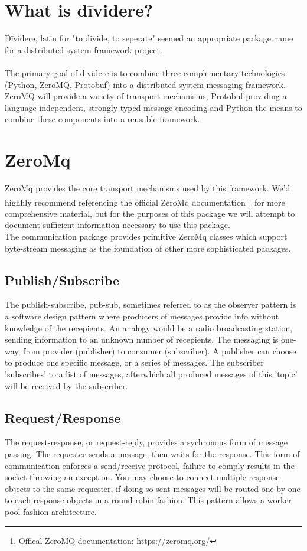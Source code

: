 \documentclass[fontsize=12pt]{book}
\begin{document}
\chapter{What is dīvidere?}

Dīvidere, latin for "to divide, to seperate" seemed an appropriate package name for a distributed system framework project.  
\\
\\
The primary goal of dīvidere is to combine three complementary technologies (Python, ZeroMQ, Protobuf) into a distributed system messaging framework.  ZeroMQ will provide a variety of transport mechanisms, Protobuf providing a language-independent, strongly-typed message encoding and Python the means to combine these components into a reusable framework.

\chapter{ZeroMq}
ZeroMq provides the core transport mechanisms used by this framework.  We'd highhly recommend referencing the official ZeroMq documentation \footnote{Offical ZeroMQ documentation: https://zeromq.org/} for more comprehensive material, but for the purposes of this package we will attempt to document sufficient information necessary to use this package.
\\
The communication package provides primitive ZeroMq classes which support byte-stream messaging as the foundation of other more sophisticated packages.

\section{Publish/Subscribe}
The publish-subscribe, pub-sub, sometimes referred to as the observer pattern is a software design pattern where producers of messages provide info without knowledge of the recepients.  An analogy would be a radio broadcasting station, sending information to an unknown number of recepients.  The messaging is one-way, from provider (publisher) to consumer (subscriber).  A publisher can choose to produce one specific message, or a series of messages.  The subscriber 'subscribes' to a list of messages, afterwhich all produced messages of this 'topic' will be received by the subscriber.
\\
\section{Request/Response}
The request-response, or request-reply, provides a sychronous form of message passing.  The requester sends a message, then waits for the response.  This form of communication enforces a send/receive protocol, failure to comply results in the socket throwing an exception.  You may choose to connect multiple response objects to the same requester, if doing so sent messages will be routed one-by-one to each response objects in a round-robin fashion.  This pattern allows a worker pool fashion architecture.
\end{document}
